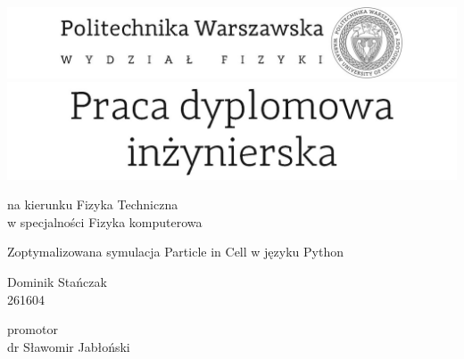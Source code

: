 

\graphicspath{{LogosPW/}}


\thispagestyle{empty}
\center
\includegraphics[scale=1]{logo.jpg}
\center
\includegraphics[scale=1]{praca_dyplomowa.jpg}

\vspace{17mm}

\normalsize
na kierunku Fizyka Techniczna \\ %
w specjalności Fizyka komputerowa \\ %

\vspace{15mm}

\Large
Zoptymalizowana symulacja Particle in Cell w języku Python  \\ %

\vspace{17mm}

\huge
Dominik Stańczak  \\ %
\normalsize
261604 \\ %

\vspace{17mm}

promotor \\
dr Sławomir Jabłoński \\ %

\vspace{15mm}

